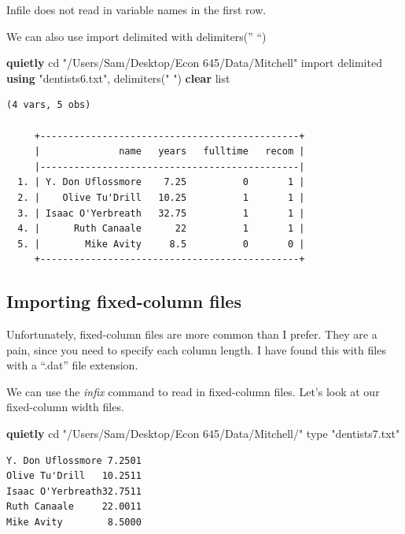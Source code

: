 \documentclass[
]{book}
\newenvironment{Shaded}{\begin{snugshade}}{\end{snugshade}}
\newcommand{\DecValTok}[1]{\textcolor[rgb]{0.00,0.00,0.81}{#1}}
\newcommand{\KeywordTok}[1]{\textcolor[rgb]{0.13,0.29,0.53}{\textbf{#1}}}
\newcommand{\NormalTok}[1]{#1}
\newcommand{\OtherTok}[1]{\textcolor[rgb]{0.56,0.35,0.01}{#1}}
\newcommand{\StringTok}[1]{\textcolor[rgb]{0.31,0.60,0.02}{#1}}
\begin{document}
Infile does not read in variable names in the first row.

We can also use import delimited with delimiters('' ``)

\begin{Shaded}
\begin{Highlighting}[]
\KeywordTok{quietly}\NormalTok{ cd }\StringTok{"/Users/Sam/Desktop/Econ 645/Data/Mitchell"}
\NormalTok{import delimited }\KeywordTok{using} \StringTok{"dentists6.txt"}\NormalTok{, delimiters(}\StringTok{" "}\NormalTok{) }\KeywordTok{clear}
\OtherTok{list}
\end{Highlighting}
\end{Shaded}

\begin{verbatim}
(4 vars, 5 obs)

     +----------------------------------------------+
     |              name   years   fulltime   recom |
     |----------------------------------------------|
  1. | Y. Don Uflossmore    7.25          0       1 |
  2. |    Olive Tu'Drill   10.25          1       1 |
  3. | Isaac O'Yerbreath   32.75          1       1 |
  4. |      Ruth Canaale      22          1       1 |
  5. |        Mike Avity     8.5          0       0 |
     +----------------------------------------------+
\end{verbatim}

\subsection{Importing fixed-column files}\label{importing-fixed-column-files}

Unfortunately, fixed-column files are more common than I prefer. They are a pain, since you need to specify each column length. I have found this with files with a ``.dat'' file extension.

We can use the \emph{infix} command to read in fixed-column files. Let's look at our fixed-column width files.

\begin{Shaded}
\begin{Highlighting}[]
\KeywordTok{quietly}\NormalTok{ cd }\StringTok{"/Users/Sam/Desktop/Econ 645/Data/Mitchell/"}
\DecValTok{type} \StringTok{"dentists7.txt"}
\end{Highlighting}
\end{Shaded}

\begin{verbatim}
Y. Don Uflossmore 7.2501
Olive Tu'Drill   10.2511
Isaac O'Yerbreath32.7511
Ruth Canaale     22.0011
Mike Avity        8.5000
\end{verbatim}
\end{document}

